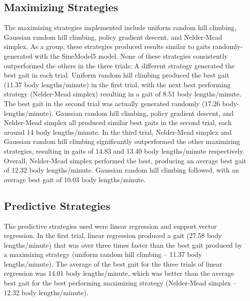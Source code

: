 \subsection{Maximizing Strategies}


The maximizing strategies implemented include uniform random hill
climbing, Gaussian random hill climbing, policy gradient descent, and
Nelder-Mead simplex. As a group, these strategies produced results
similar to gaits randomly-generated with the SineModel5 model. None
of these strategies consistently outperformed the others in the three
trials; A different strategy generated the best gait in each
trial. Uniform random hill climbing produced the best gait (11.37 body
lengths/minute) in the first trial, with the next best performing
strategy (Nelder-Mead simplex) resulting in a gait of 8.51 body
lengths/minute. The best gait in the second trial was actually
generated randomly (17.26 body-lengths/minute). Gaussian random hill
climbing, policy gradient descent, and Nelder-Mead simplex all
produced similar best gaits in the second trial, each around 14 body
lengths/minute. In the third trial, Nelder-Mead simplex and Gaussian
random hill climbing significantly outperformed the other maximizing
strategies, resulting in gaits of 14.83 and 13.40 body lengths/minute
respectively. Overall, Nelder-Mead simplex performed the best,
producing an average best gait of 12.32 body lengths/minute. Gaussian
random hill climbing followed, with an average best gait of 10.03 body
lengths/minute.



\subsection{Predictive Strategies}

The predictive strategies used were linear regression and support
vector regression. In the first trial, linear regression produced a
gait (27.58 body lengths/minute) that was over three times faster than
the best gait produced by a maximizing strategy (uniform random hill
climbing -- 11.37 body lengths/minute). The average of the best gait
for the three trials of linear regression was 14.01 body
lengths/minute, which was better than the average best gait for the
best performing maximizing strategy (Nelder-Mead simplex -- 12.32 body
lengths/minute).

%
%



